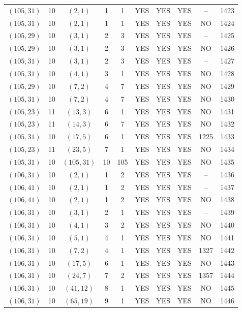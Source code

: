 \begin{longtable}{|c|c|c|c|c|c|c|c|c|c|}
$(105, 31)$ & 10 & $(2, 1)$ & 1 & 1 & YES & YES & YES & -- & 1423\\
$(105, 31)$ & 10 & $(2, 1)$ & 1 & 1 & YES & YES & YES & NO & 1424\\
$(105, 29)$ & 10 & $(3, 1)$ & 2 & 3 & YES & YES & YES & -- & 1425\\
$(105, 29)$ & 10 & $(3, 1)$ & 2 & 3 & YES & YES & YES & NO & 1426\\
$(105, 31)$ & 10 & $(3, 1)$ & 2 & 3 & YES & YES & YES & -- & 1427\\
$(105, 31)$ & 10 & $(4, 1)$ & 3 & 1 & YES & YES & YES & NO & 1428\\
$(105, 29)$ & 10 & $(7, 2)$ & 4 & 7 & YES & YES & YES & NO & 1429\\
$(105, 31)$ & 10 & $(7, 2)$ & 4 & 7 & YES & YES & YES & NO & 1430\\
$(105, 23)$ & 11 & $(13, 3)$ & 6 & 1 & YES & YES & YES & NO & 1431\\
$(105, 23)$ & 11 & $(14, 3)$ & 6 & 7 & YES & YES & YES & NO & 1432\\
$(105, 31)$ & 10 & $(17, 5)$ & 6 & 1 & YES & YES & YES & 1225 & 1433\\
$(105, 23)$ & 11 & $(23, 5)$ & 7 & 1 & YES & YES & YES & NO & 1434\\
$(105, 31)$ & 10 & $(105, 31)$ & 10 & 105 & YES & YES & YES & NO & 1435\\
$(106, 31)$ & 10 & $(2, 1)$ & 1 & 2 & YES & YES & YES & -- & 1436\\
$(106, 41)$ & 10 & $(2, 1)$ & 1 & 2 & YES & YES & YES & -- & 1437\\
$(106, 41)$ & 10 & $(2, 1)$ & 1 & 2 & YES & YES & YES & NO & 1438\\
$(106, 31)$ & 10 & $(3, 1)$ & 2 & 1 & YES & YES & YES & -- & 1439\\
$(106, 31)$ & 10 & $(4, 1)$ & 3 & 2 & YES & YES & YES & NO & 1440\\
$(106, 31)$ & 10 & $(5, 1)$ & 4 & 1 & YES & YES & YES & NO & 1441\\
$(106, 31)$ & 10 & $(7, 2)$ & 4 & 1 & YES & YES & YES & 1327 & 1442\\
$(106, 31)$ & 10 & $(17, 5)$ & 6 & 1 & YES & YES & YES & NO & 1443\\
$(106, 31)$ & 10 & $(24, 7)$ & 7 & 2 & YES & YES & YES & 1357 & 1444\\
$(106, 31)$ & 10 & $(41, 12)$ & 8 & 1 & YES & YES & YES & NO & 1445\\
$(106, 31)$ & 10 & $(65, 19)$ & 9 & 1 & YES & YES & YES & NO & 1446\\

\end{longtable}
